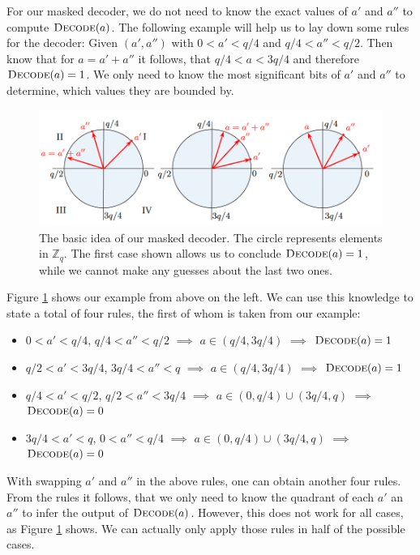 For our masked decoder, we do not need to know the exact values of \(a'\) and \(a''\) to compute \(\textsc{Decode}(a)\). The following example will help us to lay down some rules for the decoder: Given \((a', a'')\) with \(0 < a' < q/4\) and \(q/4 < a'' < q/2\). Then know that for \(a=a'+a''\) it follows, that \(q/4 < a < 3q/4\) and therefore \(\textsc{Decode}(a)=1\). We only need to know the most significant bits of \(a'\) and \(a''\) to determine, which values they are bounded by.
\begin{figure}[H]
	\centering
	\includegraphics[width=\textwidth]{maskedDecoder_1.png}
	\caption{The basic idea of our masked decoder. The circle represents elements in \(\mathbb{Z}_q\). The first case shown allows us to conclude \(\textsc{Decode}(a)=1\), while we cannot make any guesses about the last two ones. \cite{maskedRing}}
	\label{maskedDecoder_1}
\end{figure}
Figure \ref{maskedDecoder_1} shows our example from above on the left. We can use this knowledge to state a total of four rules, the first of whom is taken from our example:
\begin{itemize}
\item \(0 < a' < q/4\), \(q/4 < a'' < q/2\) \(\implies\) \(a \in (q/4,3q/4)\) \(\implies\) \(\textsc{Decode}(a)=1\)
\item \(q/2 < a' < 3q/4\), \(3q/4 < a'' < q\) \(\implies\) \(a \in (q/4,3q/4)\) \(\implies\) \(\textsc{Decode}(a)=1\)
\item \(q/4 < a' < q/2\), \(q/2 < a'' < 3q/4\) \(\implies\) \(a \in (0,q/4) \cup (3q/4,q)\) \(\implies\) \(\textsc{Decode}(a)=0\)
\item \(3q/4 < a' < q\), \(0 < a'' < q/4\) \(\implies\) \(a \in (0,q/4) \cup (3q/4,q)\) \(\implies\) \(\textsc{Decode}(a)=0\)
\end{itemize}
With swapping \(a'\) and \(a''\) in the above rules, one can obtain another four rules. From the rules it follows, that we only need to know the quadrant of each \(a'\) an \(a''\) to infer the output of \(\textsc{Decode}(a)\). However, this does not work for all cases, as Figure \ref{maskedDecoder_1} shows. We can actually only apply those rules in half of the possible cases.

